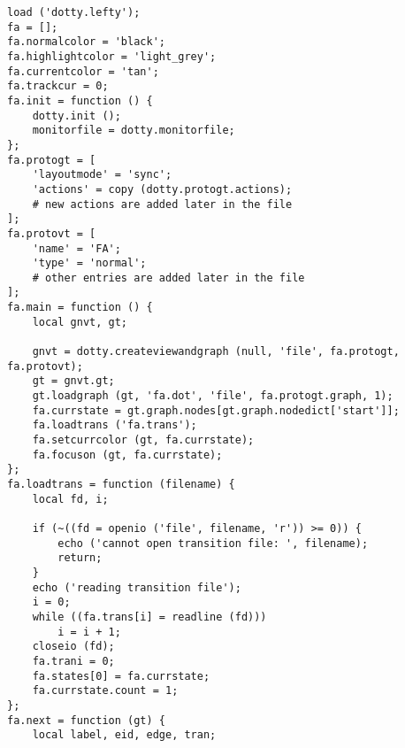 \begin{verbatim}
load ('dotty.lefty');
fa = [];
fa.normalcolor = 'black';
fa.highlightcolor = 'light_grey';
fa.currentcolor = 'tan';
fa.trackcur = 0;
fa.init = function () {
    dotty.init ();
    monitorfile = dotty.monitorfile;
};
fa.protogt = [
    'layoutmode' = 'sync';
    'actions' = copy (dotty.protogt.actions);
    # new actions are added later in the file
];
fa.protovt = [
    'name' = 'FA';
    'type' = 'normal';
    # other entries are added later in the file
];
fa.main = function () {
    local gnvt, gt;

    gnvt = dotty.createviewandgraph (null, 'file', fa.protogt, fa.protovt);
    gt = gnvt.gt;
    gt.loadgraph (gt, 'fa.dot', 'file', fa.protogt.graph, 1);
    fa.currstate = gt.graph.nodes[gt.graph.nodedict['start']];
    fa.loadtrans ('fa.trans');
    fa.setcurrcolor (gt, fa.currstate);
    fa.focuson (gt, fa.currstate);
};
fa.loadtrans = function (filename) {
    local fd, i;

    if (~((fd = openio ('file', filename, 'r')) >= 0)) {
        echo ('cannot open transition file: ', filename);
        return;
    }
    echo ('reading transition file');
    i = 0;
    while ((fa.trans[i] = readline (fd)))
        i = i + 1;
    closeio (fd);
    fa.trani = 0;
    fa.states[0] = fa.currstate;
    fa.currstate.count = 1;
};
fa.next = function (gt) {
    local label, eid, edge, tran;


\end{verbatim}
